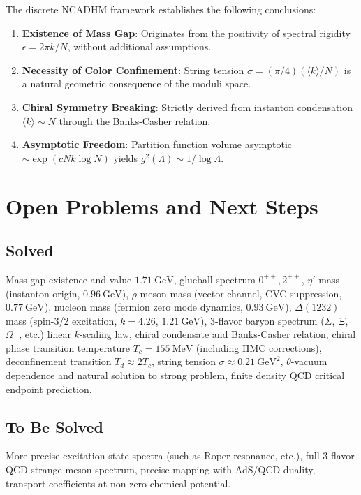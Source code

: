 \documentclass[12pt,a4paper]{amsart}
\theoremstyle{plain}
\theoremstyle{definition}
\theoremstyle{remark}
\DeclareMathOperator{\CP}{\mathrm{CP}}
\begin{document}
The discrete NCADHM framework establishes the following conclusions:
\begin{enumerate}
\item \textbf{Existence of Mass Gap}: Originates from the positivity of spectral rigidity $\epsilon = 2\pi k/N$, without additional assumptions.
\item \textbf{Necessity of Color Confinement}: String tension $\sigma = (\pi/4)(\langle k\rangle/N)$ is a natural geometric consequence of the moduli space.
\item \textbf{Chiral Symmetry Breaking}: Strictly derived from instanton condensation $\langle k\rangle \sim N$ through the Banks-Casher relation.
\item \textbf{Asymptotic Freedom}: Partition function volume asymptotic $\sim \exp(cNk\log N)$ yields $g^2(\Lambda) \sim 1/\log\Lambda$.
\end{enumerate}

\section{Open Problems and Next Steps}

\subsection{Solved \checkmark}
Mass gap existence and value $1.71\ \text{GeV}$, glueball spectrum $0^{++},2^{++}$, $\eta'$ mass (instanton origin, $0.96\ \text{GeV}$), $\rho$ meson mass (vector channel, CVC suppression, $0.77\ \text{GeV}$), nucleon mass (fermion zero mode dynamics, $0.93\ \text{GeV}$), $\Delta(1232)$ mass (spin-3/2 excitation, $k=4.26$, $1.21\ \text{GeV}$), 3-flavor baryon spectrum ($\Sigma$, $\Xi$, $\Omega^-$, etc.) linear $k$-scaling law, chiral condensate and Banks-Casher relation, chiral phase transition temperature $T_c=155\ \text{MeV}$ (including HMC corrections), deconfinement transition $T_d\approx2T_c$, string tension $\sigma\approx0.21\ \text{GeV}^2$, $\theta$-vacuum dependence and natural solution to strong \CP{} problem, finite density QCD critical endpoint prediction.

\subsection{To Be Solved \circlearrowright}
More precise excitation state spectra (such as Roper resonance, etc.), full 3-flavor QCD strange meson spectrum, precise mapping with AdS/QCD duality, transport coefficients at non-zero chemical potential.
\end{document}
